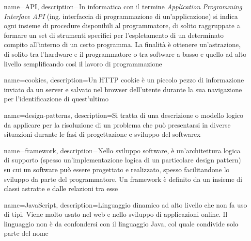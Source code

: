 
\renewcommand{\acronymname}{Acronimi e abbreviazioni}



{
    name=API,
    description={In informatica con il termine \emph{Application Programming Interface API} (ing. interfaccia di programmazione di un'applicazione) si indica ogni insieme di procedure disponibili al programmatore, di solito raggruppate a formare un set di strumenti specifici per l'espletamento di un determinato compito all'interno di un certo programma. La finalità è ottenere un'astrazione, di solito tra l'hardware e il programmatore o tra software a basso e quello ad alto livello semplificando così il lavoro di programmazione}
}

{
    name=cookies,
    description={Un HTTP cookie è un piccolo pezzo di informazione inviato da un server e salvato nel browser dell'utente durante la sua navigazione per l'identificazione di quest'ultimo}
}

{
    name=design-patterns,
    description={Si tratta di una descrizione o modello logico da applicare per la risoluzione di un problema che può presentarsi in diverse situazioni durante le fasi di progettazione e sviluppo del softwarex}
}

{
    name=framework,
    description={Nello sviluppo software, è un'architettura logica di supporto (spesso un'implementazione logica di un particolare design pattern) su cui un software può essere progettato e realizzato, spesso facilitandone lo sviluppo da parte del programmatore.
    Un framework è definito da un insieme di classi astratte e dalle relazioni tra esse}
}

{
    name=JavaScript,
    description={Linguaggio dinamico ad alto livello che non fa uso di tipi. Viene molto usato nel web e nello sviluppo di applicazioni online. Il linguaggio non è da confondersi con il linguaggio Java, col quale condivide solo parte del nome}
}

